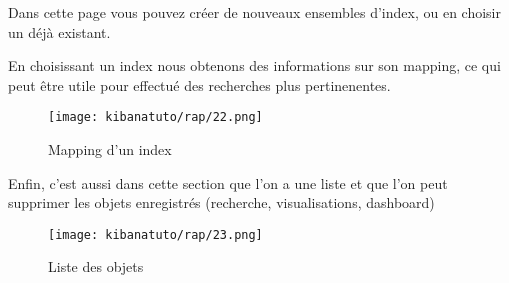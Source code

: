 Dans cette page vous pouvez créer de nouveaux ensembles d'index, ou en choisir un 
déjà existant.

En choisissant un index nous obtenons des informations sur son mapping, ce qui peut 
être utile pour effectué des recherches plus pertinenentes.


\begin{figure}[H]
\center
\texttt{[image: kibanatuto/rap/22.png]}
\label{fig:kibanatuto14}
\caption{Mapping d'un index}
\end{figure}

Enfin, c'est aussi dans cette section que l'on a une liste et que l'on peut supprimer les 
objets enregistrés (recherche, visualisations, dashboard)

\begin{figure}[H]
\center
\texttt{[image: kibanatuto/rap/23.png]}
\label{fig:kibanatuto15}
\caption{Liste des objets}
\end{figure}

